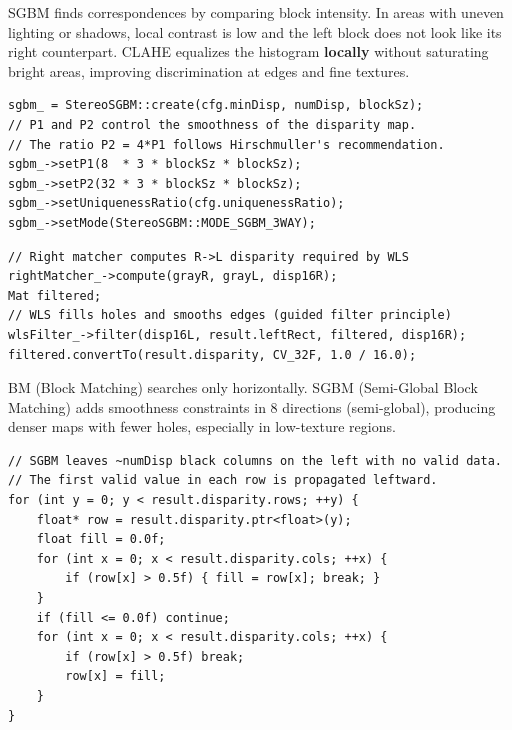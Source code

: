 \documentclass[11pt,a4paper]{article}
\begin{document}
\begin{critbox}[frametitle={Why CLAHE before SGBM}]
SGBM finds correspondences by comparing block intensity. In areas with uneven
lighting or shadows, local contrast is low and the left block does not look like its
right counterpart. CLAHE equalizes the histogram \textbf{locally} without saturating
bright areas, improving discrimination at edges and fine textures.
\end{critbox}

\begin{lstlisting}[caption={Step 4: SGBM -- key parameters (lines 29--35)}]
sgbm_ = StereoSGBM::create(cfg.minDisp, numDisp, blockSz);
// P1 and P2 control the smoothness of the disparity map.
// The ratio P2 = 4*P1 follows Hirschmuller's recommendation.
sgbm_->setP1(8  * 3 * blockSz * blockSz);
sgbm_->setP2(32 * 3 * blockSz * blockSz);
sgbm_->setUniquenessRatio(cfg.uniquenessRatio);
sgbm_->setMode(StereoSGBM::MODE_SGBM_3WAY);
\end{lstlisting}

\begin{lstlisting}[caption={Step 5: WLS postprocessing (lines 101--108)}]
// Right matcher computes R->L disparity required by WLS
rightMatcher_->compute(grayR, grayL, disp16R);
Mat filtered;
// WLS fills holes and smooths edges (guided filter principle)
wlsFilter_->filter(disp16L, result.leftRect, filtered, disp16R);
filtered.convertTo(result.disparity, CV_32F, 1.0 / 16.0);
\end{lstlisting}

\begin{critbox}[frametitle={SGBM vs BM --- why we use SGBM}]
BM (Block Matching) searches only horizontally. SGBM (Semi-Global Block Matching)
adds smoothness constraints in 8 directions (semi-global), producing denser maps
with fewer holes, especially in low-texture regions.
\end{critbox}

\begin{lstlisting}[caption={Step 6: Invalid-zone fill (horizontal propagation)}]
// SGBM leaves ~numDisp black columns on the left with no valid data.
// The first valid value in each row is propagated leftward.
for (int y = 0; y < result.disparity.rows; ++y) {
    float* row = result.disparity.ptr<float>(y);
    float fill = 0.0f;
    for (int x = 0; x < result.disparity.cols; ++x) {
        if (row[x] > 0.5f) { fill = row[x]; break; }
    }
    if (fill <= 0.0f) continue;
    for (int x = 0; x < result.disparity.cols; ++x) {
        if (row[x] > 0.5f) break;
        row[x] = fill;
    }
}
\end{lstlisting}
\end{document}
